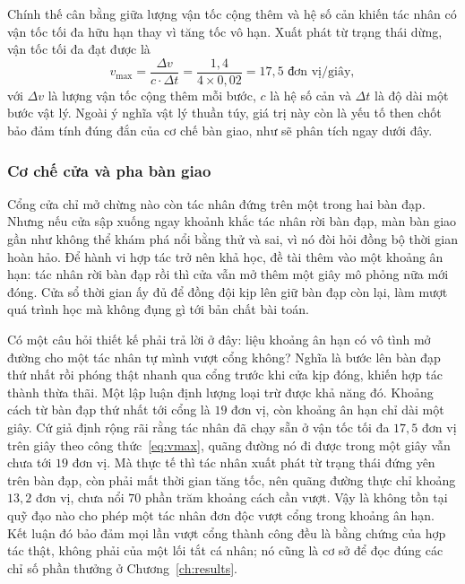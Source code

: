 \indent Chính thế cân bằng giữa lượng vận tốc cộng thêm và hệ số cản khiến tác nhân có vận
tốc tối đa hữu hạn thay vì tăng tốc vô hạn. Xuất phát từ trạng thái dừng, vận tốc tối đa
đạt được là
\begin{equation}
v_{\max} = \frac{\Delta v}{c \cdot \Delta t}
         = \frac{1{,}4}{4 \times 0{,}02} = 17{,}5 \text{ đơn vị/giây},
\label{eq:vmax}
\end{equation}
với $\Delta v$ là lượng vận tốc cộng thêm mỗi bước, $c$ là hệ số cản và $\Delta t$ là
độ dài một bước vật lý. Ngoài ý nghĩa vật lý thuần túy, giá trị này còn là yếu tố then
chốt bảo đảm tính đúng đắn của cơ chế bàn giao, như sẽ phân tích ngay dưới đây.

\subsubsection{Cơ chế cửa và pha bàn giao}
\label{sub:coop-handoff}
\indent Cổng cửa chỉ mở chừng nào còn tác nhân đứng trên một trong hai bàn đạp. Nhưng nếu
cửa sập xuống ngay khoảnh khắc tác nhân rời bàn đạp, màn bàn giao gần như không thể khám phá
nổi bằng thử và sai, vì nó đòi hỏi đồng bộ thời gian hoàn hảo. Để hành vi hợp tác trở
nên khả học, đề tài thêm vào một khoảng ân hạn: tác nhân rời bàn đạp rồi thì cửa vẫn mở
thêm một giây mô phỏng nữa mới đóng. Cửa sổ thời gian ấy đủ để đồng đội kịp lên giữ bàn
đạp còn lại, làm mượt quá trình học mà không đụng gì tới bản chất bài toán.

\indent Có một câu hỏi thiết kế phải trả lời ở đây: liệu khoảng ân hạn có vô tình mở đường
cho một tác nhân tự mình vượt cổng không? Nghĩa là bước lên bàn đạp thứ nhất rồi phóng
thật nhanh qua cổng trước khi cửa kịp đóng, khiến hợp tác thành thừa thãi. Một lập luận
định lượng loại trừ được khả năng đó. Khoảng cách từ bàn đạp thứ nhất tới cổng là $19$ đơn vị,
còn khoảng ân hạn chỉ dài một giây. Cứ giả định rộng rãi rằng tác nhân đã
chạy sẵn ở vận tốc tối đa $17{,}5$ đơn vị trên giây theo công thức~\eqref{eq:vmax}, quãng
đường nó đi được trong một giây vẫn chưa tới $19$ đơn vị. Mà thực tế thì tác nhân
xuất phát từ trạng thái đứng yên trên bàn đạp, còn phải mất thời gian tăng tốc, nên quãng
đường thực chỉ khoảng $13{,}2$ đơn vị, chưa nổi $70$ phần trăm khoảng cách cần vượt. Vậy là
không tồn tại quỹ đạo nào cho phép một tác nhân đơn độc vượt cổng trong
khoảng ân hạn. Kết luận đó bảo đảm mọi lần vượt cổng thành công đều là bằng chứng của hợp
tác thật, không phải của một lối tắt cá nhân; nó cũng là cơ sở để đọc đúng các chỉ số phần
thưởng ở Chương~\ref{ch:results}.

